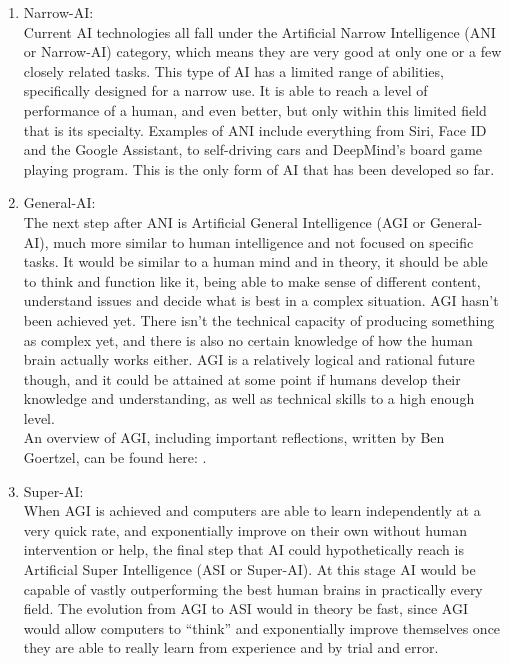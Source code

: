 \begin{enumerate}
\item Narrow-AI: \\
Current AI technologies all fall under the Artificial Narrow Intelligence (ANI or Narrow-AI) category, which means they are very good at only one or a few closely related tasks. This type of AI has a limited range of abilities, specifically designed for a narrow use. It is able to reach a level of performance of a human, and even better, but only within this limited field that is its specialty. Examples of ANI include everything from Siri, Face ID and the Google Assistant, to self-driving cars and DeepMind’s board game playing program. This is the only form of AI that has been developed so far.

\item General-AI: \\
The next step after ANI is Artificial General Intelligence (AGI or General-AI), much more similar to human intelligence and not focused on specific tasks. It would be similar to a human mind and in theory, it should be able to think and function like it, being able to make sense of different content, understand issues and decide what is best in a complex situation. 
AGI hasn’t been achieved yet. There isn't the technical capacity of producing something as complex yet, and there is also no certain knowledge of how the human brain actually works either. 
AGI is a relatively logical and rational future though, and it could be attained at some point if humans develop their knowledge and understanding, as well as technical skills to a high enough level. \\
An overview of AGI, including important reflections, written by Ben Goertzel, can be found here: \cite{goertzel_AGI}.

\item Super-AI: \\
When AGI is achieved and computers are able to learn independently at a very quick rate, and exponentially improve on their own without human intervention or help, the final step that AI could hypothetically reach is Artificial Super Intelligence (ASI or Super-AI). At this stage AI would be capable of vastly outperforming the best human brains in practically every field. The evolution from AGI to ASI would in theory be fast, since AGI would allow computers to “think” and exponentially improve themselves once they are able to really learn from experience and by trial and error.
\end{enumerate}

